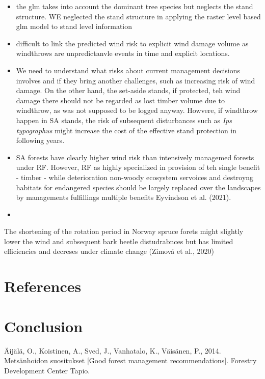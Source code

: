 \documentclass[]{elsarticle} %
\begin{document}
\begin{itemize}
\item
  the glm takes into account the dominant tree species but neglects the
  stand structure. WE neglected the stand structure in applying the
  raster level based glm model to stand level information
\item
  difficult to link the predicted wind risk to explicit wind damage
  volume as windthrows are unpredictanvle events in time and explicit
  locations.
\item
  We need to understand what risks about current management decisions
  involves and if they bring another challenges, such as increasing risk
  of wind damage. On the other hand, the set-aside stands, if protected,
  teh wind damage there should not be regarded as lost timber volume due
  to windthrow, as was not supposed to be logged anyway. Howvere, if
  windthrow happen in SA stands, the risk of subsequent disturbances
  such as \emph{Ips typographus} might increase the cost of the
  effective stand protection in following years.
\item
  SA forests have clearly higher wind risk than intensively managemed
  forests under RF. However, RF as highly specialized in provision of
  teh single benefit - timber - while deterioration non-woody ecosystem
  servoices and destroyng habitats for endangered species should be
  largely replaced over the landscapes by managements fulfillings
  multiple benefits Eyvindson et al. (2021).
\item
\end{itemize}

The shortening of the rotation period in Norway spruce forets might
slightly lower the wind and subsequent bark beetle distudrabnces but has
limited efficiencies and decreses under climate change (Zimová et al.,
2020)

\section*{References}\label{references}

\section*{Conclusion}\label{conclusion}

\hypertarget{refs}{}
\hypertarget{ref-Aijala2014a}{}
Äijälä, O., Koistinen, A., Sved, J., Vanhatalo, K., Väisänen, P., 2014.
Metsänhoidon suositukset {[}Good forest management recommendations{]}.
Forestry Development Center Tapio.
\end{document}
